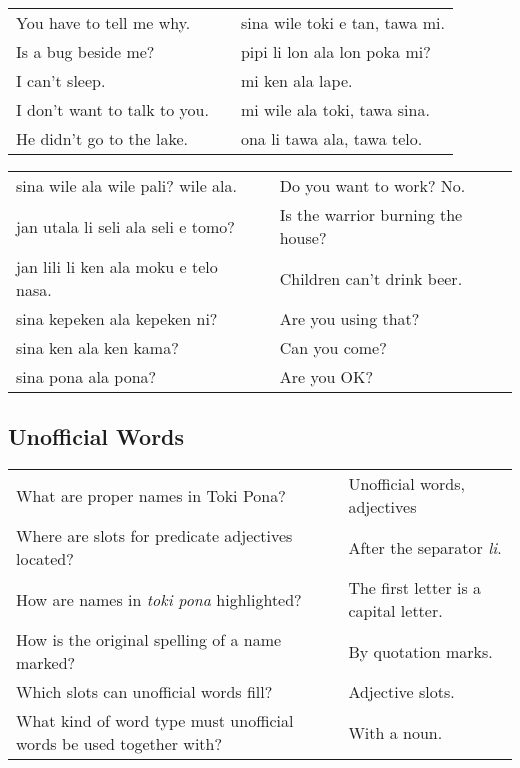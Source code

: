\begin{supertabular}{p{5,5cm}|ll}
    You have to tell me why.     &  & sina wile toki e tan, tawa mi. \\
    Is a bug beside me?          &  & pipi li lon ala lon poka mi?   \\
    I can't sleep.               &  & mi ken ala lape.               \\
    I don't want to talk to you. &  & mi wile ala toki, tawa sina.   \\
    He didn't go to the lake.    &  & ona li tawa ala, tawa telo.    \\
\end{supertabular}

\begin{supertabular}{p{5,5cm}|ll}
    sina wile ala wile pali? wile ala.    &  & Do you want to work? No.          \\
    jan utala li seli ala seli e tomo?    &  & Is the warrior burning the house? \\
    jan lili li ken ala moku e telo nasa. &  & Children can't drink beer.        \\
    sina kepeken ala kepeken ni?          &  & Are you using that?               \\
    sina ken ala ken kama?                &  & Can you come?                     \\
    sina pona ala pona?                   &  & Are you OK?                       \\
\end{supertabular}

\newpage

\subsection*{Unofficial Words}
\label{'unofficial_words_answers'}

\begin{supertabular}{p{5,5cm}|ll}
    What are proper names in Toki Pona?                                 &  & Unofficial words, adjectives          \\
    Where are slots for predicate adjectives located?                   &  & After the separator \textit{li}.      \\
    How are names in \textit{toki pona} highlighted?                    &  & The first letter is a capital letter. \\
    How is the original spelling of a name marked?                      &  & By quotation marks.                   \\
    Which slots can unofficial words fill?                              &  & Adjective slots.                      \\
    What kind of word type must unofficial words be used together with? &  & With a noun.                          \\
\end{supertabular}

